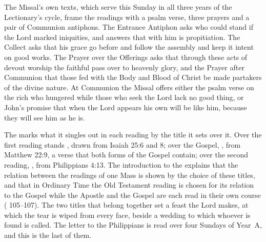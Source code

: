 The Missal's own texts, which serve this Sunday in all three years of the
Lectionary's cycle, frame the readings with a psalm verse, three prayers and a
pair of Communion antiphons. The Entrance Antiphon asks who could stand if the
Lord marked iniquities, and answers that with him is propitiation. The Collect
asks that his grace go before and follow the assembly and keep it intent on
good works. The Prayer over the Offerings asks that through these acts of
devout worship the faithful pass over to heavenly glory, and the Prayer after
Communion that those fed with the Body and Blood of Christ be made partakers of
the divine nature. At Communion the Missal offers either the psalm verse on
the rich who hungered while those who seek the Lord lack no good thing, or
John's promise that when the Lord appears his own will be like him, because
they will see him as he is.

The  marks what it singles out in each reading by
the title it sets over it. Over the first reading stands , drawn from Isaiah 25:6 and 8;
over the Gospel, , from
Matthew 22:9, a verse that both forms of the Gospel contain; over the second
reading, , from Philippians 4:13.
The introduction to the  explains that the relation between the
readings of one Mass is shown by the choice of these titles, and that in
Ordinary Time the Old Testament reading is chosen for its relation to the
Gospel while the Apostle and the Gospel are each read in their own course
( 105--107). The two titles that belong together set a feast
the Lord makes, at which the tear is wiped from every face, beside a wedding to
which whoever is found is called. The letter to the Philippians is read over
four Sundays of Year~A, and this is the last of them.

